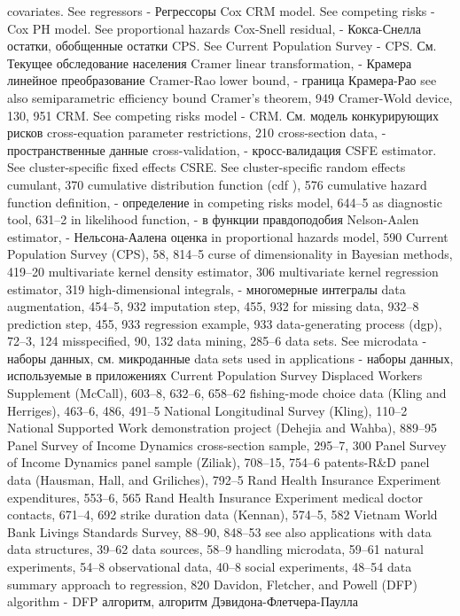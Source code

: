 covariates. See regressors - Регрессоры
Cox CRM model. See competing risks - 
Cox PH model. See proportional hazards 
Cox-Snell residual, - Кокса-Снелла остатки, обобщенные остатки
CPS. See Current Population Survey - CPS. См. Текущее обследование населения
Cramer linear transformation, - Крамера линейное преобразование
Cramer-Rao lower bound, - граница Крамера-Рао
see also semiparametric efficiency bound Cramer’s theorem, 949
Cramer-Wold device, 130, 951
CRM. See competing risks model - CRM. См. модель конкурирующих рисков
cross-equation parameter restrictions, 210 
cross-section data, - пространственные данные
cross-validation, - кросс-валидация
CSFE estimator. See cluster-specific fixed effects CSRE. See cluster-specific random effects cumulant, 370
cumulative distribution function (cdf ), 576 cumulative hazard function
definition, - определение
in competing risks model, 644–5
as diagnostic tool, 631–2
in likelihood function, - в функции правдоподобия
Nelson-Aalen estimator, - Нельсона-Аалена оценка 
in proportional hazards model, 590
Current Population Survey (CPS), 58, 814–5 curse of dimensionality
in Bayesian methods, 419–20
multivariate kernel density estimator, 306 multivariate kernel regression estimator, 319 
high-dimensional integrals, - многомерные интегралы
data augmentation, 454–5, 932 imputation step, 455, 932 for missing data, 932–8 prediction step, 455, 933 regression example, 933
data-generating process (dgp), 72–3, 124 misspecified, 90, 132
data mining, 285–6
data sets. See microdata - наборы данных, см. микроданные
data sets used in applications - наборы данных, используемые в приложениях
Current Population Survey Displaced Workers Supplement (McCall), 603–8, 632–6, 658–62
fishing-mode choice data (Kling and Herriges), 463–6, 486, 491–5
National Longitudinal Survey (Kling), 110–2 National Supported Work demonstration project
(Dehejia and Wahba), 889–95
Panel Survey of Income Dynamics cross-section
sample, 295–7, 300
Panel Survey of Income Dynamics panel sample
(Ziliak), 708–15, 754–6
patents-R&D panel data (Hausman, Hall, and
Griliches), 792–5
Rand Health Insurance Experiment expenditures,
553–6, 565
Rand Health Insurance Experiment medical doctor
contacts, 671–4, 692
strike duration data (Kennan), 574–5, 582 Vietnam World Bank Livings Standards Survey,
88–90, 848–53
see also applications with data
data structures, 39–62
data sources, 58–9 handling microdata, 59–61 natural experiments, 54–8 observational data, 40–8 social experiments, 48–54
data summary approach to regression, 820
Davidon, Fletcher, and Powell (DFP) algorithm - DFP алгоритм, алгоритм Дэвидона-Флетчера-Паулла
